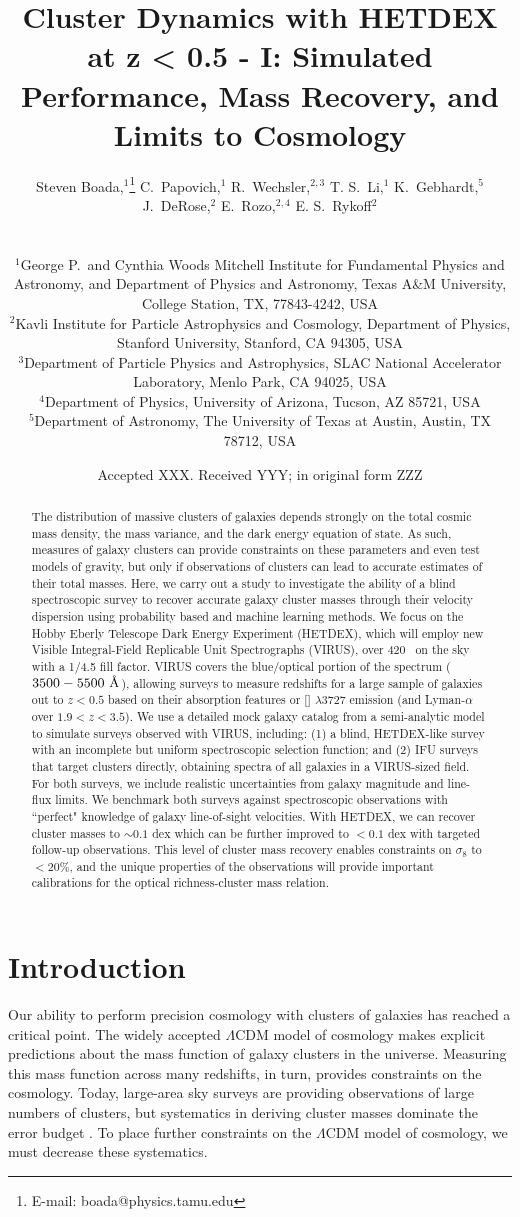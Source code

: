 \documentclass[fleqn,usenatbib]{mnras}
\title[Galaxy Clusters with HETDEX]{Cluster Dynamics with HETDEX at z < 0.5 - I: Simulated Performance, Mass Recovery, and Limits to Cosmology}
\author[S. Boada et al.]
{\parbox{\textwidth}{Steven Boada,$^{1}$\thanks{E-mail: boada@physics.tamu.edu}
C.~Papovich,$^{1}$
R.~Wechsler,$^{2,3}$
T. S.~Li,$^{1}$
K.~Gebhardt,$^{5}$
J.~DeRose,$^{2}$
E.~Rozo,$^{2,4}$
E. S.~Rykoff$^{2}$}\vspace{0.4cm}\
\\
\parbox{\textwidth}{$^{1}$George P.\ and Cynthia Woods Mitchell Institute for Fundamental Physics and Astronomy, and Department of Physics and Astronomy, Texas A\&M University, College Station, TX, 77843-4242, USA\\
$^{2}$Kavli Institute for Particle Astrophysics and Cosmology, Department of Physics, Stanford University, Stanford, CA 94305, USA\\
$^{3}$Department of Particle Physics and Astrophysics, SLAC National Accelerator Laboratory, Menlo Park, CA 94025, USA\\
$^{4}$Department of Physics, University of Arizona, Tucson, AZ 85721, USA\\
$^{5}$Department of Astronomy, The University of Texas at Austin, Austin, TX 78712, USA}}
\date{Accepted XXX. Received YYY; in original form ZZZ}
\begin{document}
\label{firstpage}
\pagerange{\pageref{firstpage}--\pageref{lastpage}}
\maketitle

\begin{abstract}
\noindent
The distribution of massive clusters of galaxies depends strongly on the total cosmic mass density, the mass variance, and the dark energy equation of state. As such, measures of galaxy clusters can provide constraints on these parameters and even test models of gravity, but only if observations of clusters can lead to accurate estimates of their total masses. Here, we carry out a study to investigate the ability of a blind spectroscopic survey to recover accurate galaxy cluster masses through their velocity dispersion using probability based and machine learning methods. We focus on the Hobby Eberly Telescope Dark Energy Experiment (HETDEX), which will employ new Visible Integral-Field Replicable Unit Spectrographs (VIRUS), over 420 \degsq\ on the sky with a 1/4.5 fill factor. VIRUS covers the blue/optical portion of the spectrum ($3500-5500~\hbox{\AA}$), allowing surveys to measure redshifts for a large sample of galaxies out to $z < 0.5$ based on their absorption features or [] $\lambda$3727 emission (and Lyman-$\alpha$ over $1.9 < z < 3.5$). We use a detailed mock galaxy catalog from a semi-analytic model to simulate surveys observed with VIRUS, including: (1) a blind, HETDEX-like survey with an incomplete but uniform spectroscopic selection function; and (2) IFU surveys that target clusters directly, obtaining spectra of all galaxies in a VIRUS-sized field. For both surveys, we include realistic uncertainties from galaxy magnitude and line-flux limits. We benchmark both surveys against spectroscopic observations with ``perfect" knowledge of galaxy line-of-sight velocities. With HETDEX, we can recover cluster masses to $\sim0.1$ dex which can be further improved to $<0.1$ dex with targeted follow-up observations. This level of cluster mass recovery enables constraints on $\sigma_8$ to $<20$\%, and the unique properties of the observations will provide important calibrations for the optical richness-cluster mass relation.
\end{abstract}

\section{Introduction}\label{sec: Introduction}
Our ability to perform precision cosmology with clusters of galaxies has reached a critical point. The widely accepted $\Lambda$CDM model of cosmology makes explicit predictions about the mass function of galaxy clusters in the universe. Measuring this mass function across many redshifts, in turn, provides constraints on the cosmology. Today, large-area sky surveys are providing observations of large numbers of clusters, but systematics in deriving cluster masses dominate the error budget . To place further constraints on the $\Lambda$CDM model of cosmology, we must decrease these systematics. 
\end{document}
